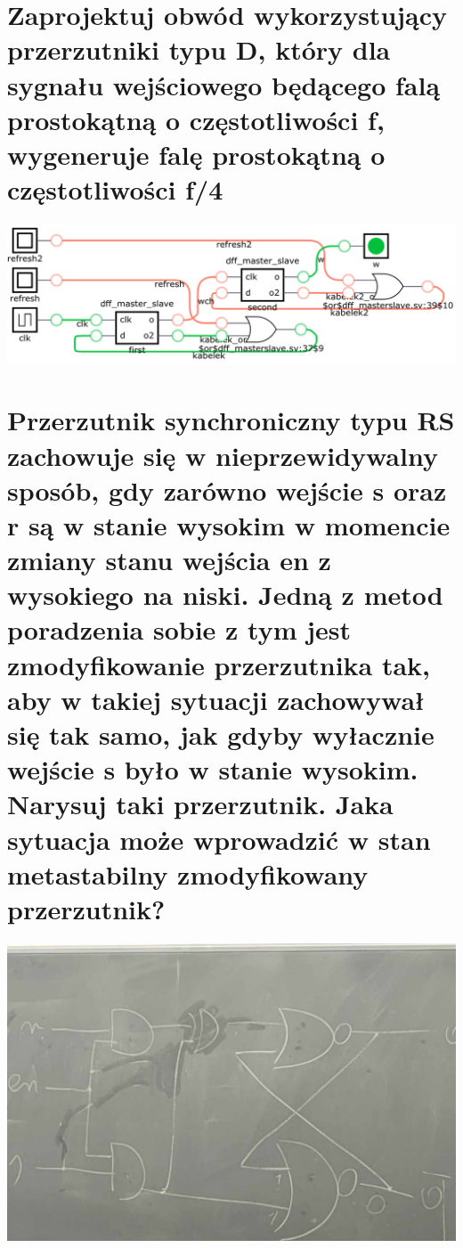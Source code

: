 \documentclass{article}
\begin{document}
\section{Zaprojektuj obwód wykorzystujący przerzutniki typu D, który dla sygnału wejściowego będącego falą prostokątną o częstotliwości f, wygeneruje falę prostokątną o częstotliwości f/4}
\begin{center}
\includegraphics[scale=0.3]{./L06Z03.png}
\end{center}
\section{Przerzutnik synchroniczny typu RS zachowuje się w nieprzewidywalny sposób, gdy zarówno wejście s oraz r są w stanie wysokim w momencie zmiany stanu wejścia en z wysokiego na niski. Jedną z metod poradzenia sobie z tym jest zmodyfikowanie przerzutnika tak, aby w takiej sytuacji zachowywał się tak samo, jak gdyby wyłacznie wejście s było w stanie wysokim. Narysuj taki przerzutnik. Jaka sytuacja może wprowadzić w stan metastabilny zmodyfikowany przerzutnik?}
\begin{center}
\includegraphics[scale=0.3]{./L06Z04.jpg}
\end{center}
\end{document}
